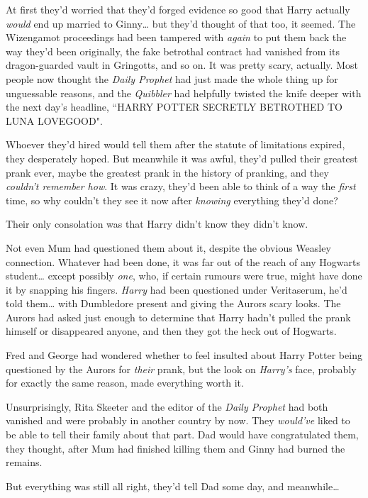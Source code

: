 At first they'd worried that they'd forged evidence so good that Harry actually \emph{would} end up married to Ginny{\ldots} but they'd thought of that too, it seemed. The Wizengamot proceedings had been tampered with \emph{again} to put them back the way they'd been originally, the fake betrothal contract had vanished from its dragon-guarded vault in Gringotts, and so on. It was pretty scary, actually. Most people now thought the \emph{Daily Prophet} had just made the whole thing up for unguessable reasons, and the \emph{Quibbler} had helpfully twisted the knife deeper with the next day's headline, ``HARRY POTTER SECRETLY BETROTHED TO LUNA LOVEGOOD".

Whoever they'd hired would tell them after the statute of limitations expired, they desperately hoped. But meanwhile it was awful, they'd pulled their greatest prank ever, maybe the greatest prank in the history of pranking, and they \emph{couldn't remember how}. It was crazy, they'd been able to think of a way the \emph{first} time, so why couldn't they see it now after \emph{knowing} everything they'd done?

Their only consolation was that Harry didn't know they didn't know.

Not even Mum had questioned them about it, despite the obvious Weasley connection. Whatever had been done, it was far out of the reach of any Hogwarts student{\ldots} except possibly \emph{one}, who, if certain rumours were true, might have done it by snapping his fingers. \emph{Harry} had been questioned under Veritaserum, he'd told them{\ldots} with Dumbledore present and giving the Aurors scary looks. The Aurors had asked just enough to determine that Harry hadn't pulled the prank himself or disappeared anyone, and then they got the heck out of Hogwarts.

Fred and George had wondered whether to feel insulted about Harry Potter being questioned by the Aurors for \emph{their} prank, but the look on \emph{Harry's} face, probably for exactly the same reason, made everything worth it.

Unsurprisingly, Rita Skeeter and the editor of the \emph{Daily Prophet} had both vanished and were probably in another country by now. They \emph{would've} liked to be able to tell their family about that part. Dad would have congratulated them, they thought, after Mum had finished killing them and Ginny had burned the remains.

But everything was still all right, they'd tell Dad some day, and meanwhile{\ldots}

